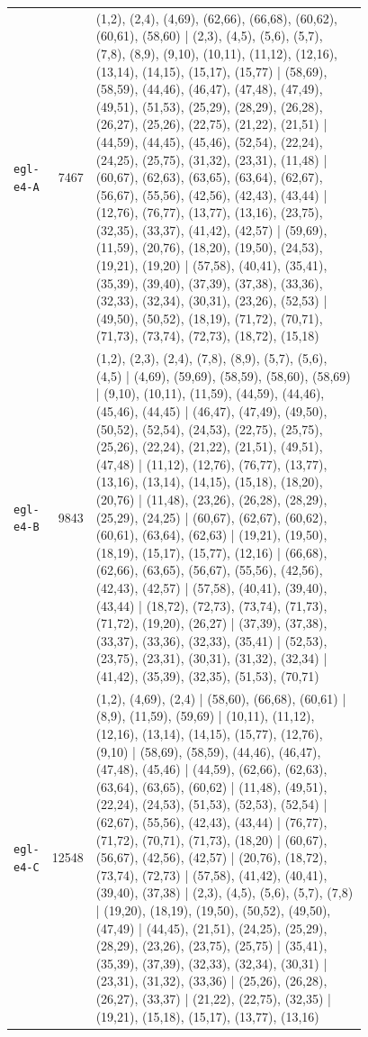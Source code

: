\begin{landscape}
\begin{longtable}{lr>{\tiny\raggedright\arraybackslash}p{0.78\linewidth}}
\texttt{egl-e4-A} & 7467 & (1,2), (2,4), (4,69), (62,66), (66,68), (60,62), (60,61), (58,60) | (2,3), (4,5), (5,6), (5,7), (7,8), (8,9), (9,10), (10,11), (11,12), (12,16), (13,14), (14,15), (15,17), (15,77) | (58,69), (58,59), (44,46), (46,47), (47,48), (47,49), (49,51), (51,53), (25,29), (28,29), (26,28), (26,27), (25,26), (22,75), (21,22), (21,51) | (44,59), (44,45), (45,46), (52,54), (22,24), (24,25), (25,75), (31,32), (23,31), (11,48) | (60,67), (62,63), (63,65), (63,64), (62,67), (56,67), (55,56), (42,56), (42,43), (43,44) | (12,76), (76,77), (13,77), (13,16), (23,75), (32,35), (33,37), (41,42), (42,57) | (59,69), (11,59), (20,76), (18,20), (19,50), (24,53), (19,21), (19,20) | (57,58), (40,41), (35,41), (35,39), (39,40), (37,39), (37,38), (33,36), (32,33), (32,34), (30,31), (23,26), (52,53) | (49,50), (50,52), (18,19), (71,72), (70,71), (71,73), (73,74), (72,73), (18,72), (15,18) \\[2pt]
\texttt{egl-e4-B} & 9843 & (1,2), (2,3), (2,4), (7,8), (8,9), (5,7), (5,6), (4,5) | (4,69), (59,69), (58,59), (58,60), (58,69) | (9,10), (10,11), (11,59), (44,59), (44,46), (45,46), (44,45) | (46,47), (47,49), (49,50), (50,52), (52,54), (24,53), (22,75), (25,75), (25,26), (22,24), (21,22), (21,51), (49,51), (47,48) | (11,12), (12,76), (76,77), (13,77), (13,16), (13,14), (14,15), (15,18), (18,20), (20,76) | (11,48), (23,26), (26,28), (28,29), (25,29), (24,25) | (60,67), (62,67), (60,62), (60,61), (63,64), (62,63) | (19,21), (19,50), (18,19), (15,17), (15,77), (12,16) | (66,68), (62,66), (63,65), (56,67), (55,56), (42,56), (42,43), (42,57) | (57,58), (40,41), (39,40), (43,44) | (18,72), (72,73), (73,74), (71,73), (71,72), (19,20), (26,27) | (37,39), (37,38), (33,37), (33,36), (32,33), (35,41) | (52,53), (23,75), (23,31), (30,31), (31,32), (32,34) | (41,42), (35,39), (32,35), (51,53), (70,71) \\[2pt]
\texttt{egl-e4-C} & 12548 & (1,2), (4,69), (2,4) | (58,60), (66,68), (60,61) | (8,9), (11,59), (59,69) | (10,11), (11,12), (12,16), (13,14), (14,15), (15,77), (12,76), (9,10) | (58,69), (58,59), (44,46), (46,47), (47,48), (45,46) | (44,59), (62,66), (62,63), (63,64), (63,65), (60,62) | (11,48), (49,51), (22,24), (24,53), (51,53), (52,53), (52,54) | (62,67), (55,56), (42,43), (43,44) | (76,77), (71,72), (70,71), (71,73), (18,20) | (60,67), (56,67), (42,56), (42,57) | (20,76), (18,72), (73,74), (72,73) | (57,58), (41,42), (40,41), (39,40), (37,38) | (2,3), (4,5), (5,6), (5,7), (7,8) | (19,20), (18,19), (19,50), (50,52), (49,50), (47,49) | (44,45), (21,51), (24,25), (25,29), (28,29), (23,26), (23,75), (25,75) | (35,41), (35,39), (37,39), (32,33), (32,34), (30,31) | (23,31), (31,32), (33,36) | (25,26), (26,28), (26,27), (33,37) | (21,22), (22,75), (32,35) | (19,21), (15,18), (15,17), (13,77), (13,16) \\[2pt]

\end{longtable}
\end{landscape}
